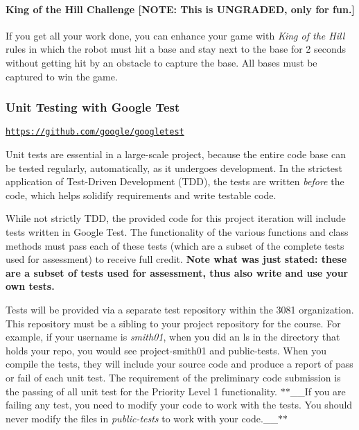 \paragraph*{King of the Hill Challenge \mbox{[}N\+O\+TE\+: This is U\+N\+G\+R\+A\+D\+ED, only for fun.\mbox{]}}

If you get all your work done, you can enhance your game with {\itshape King of the Hill} rules in which the robot must hit a base and stay next to the base for 2 seconds without getting hit by an obstacle to capture the base. All bases must be captured to win the game.





\subsubsection*{Unit Testing with Google Test}

\href{https://github.com/google/googletest}{\tt https\+://github.\+com/google/googletest}

Unit tests are essential in a large-\/scale project, because the entire code base can be tested regularly, automatically, as it undergoes development. In the strictest application of Test-\/\+Driven Development (T\+DD), the tests are written {\itshape before} the code, which helps solidify requirements and write testable code.

While not strictly T\+DD, the provided code for this project iteration will include tests written in Google Test. The functionality of the various functions and class methods must pass each of these tests (which are a subset of the complete tests used for assessment) to receive full credit. {\bfseries Note what was just stated\+: these are a subset of tests used for assessment, thus also write and use your own tests.}

Tests will be provided via a separate test repository within the 3081 organization. This repository must be a sibling to your project repository for the course. For example, if your username is {\itshape smith01}, when you did an {\ttfamily ls} in the directory that holds your repo, you would see {\ttfamily project-\/smith01} and {\ttfamily public-\/tests}. When you compile the tests, they will include your source code and produce a report of pass or fail of each unit test. The requirement of the preliminary code submission is the passing of all unit test for the Priority Level 1 functionality. $\ast$$\ast$\+\_\+\+\_\+\+If you are failing any test, you need to modify your code to work with the tests. You should never modify the files in {\itshape public-\/tests} to work with your code.\+\_\+\+\_\+$\ast$$\ast$

